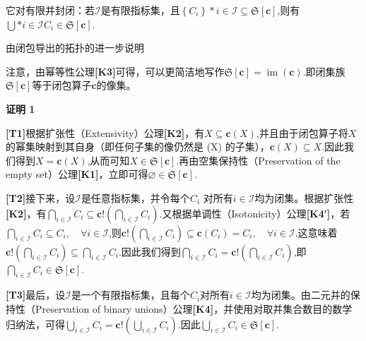 它对有限并封闭：若$\mathcal{I}$是有限指标集，且$\left\{ C_i \right\}*{i \in \mathcal{I}} \subseteq {\mathfrak{S}}[\mathbf{c}]$,则有$\bigcup*{i \in \mathcal{I}} C_i \in {\mathfrak{S}}[\mathbf{c}]$.

由闭包导出的拓扑的进一步说明

注意，由幂等性公理\textbf{[K3]}可得，可以更简洁地写作${\mathfrak{S}}[\mathbf{c}] = \operatorname{im}(\mathbf{c})$.即闭集族${\mathfrak{S}}[\mathbf{c}]$等于闭包算子$\mathbf{c}$的像集。

\textbf{证明 1}

\textbf{[T1]}根据扩张性（Extensivity）公理\textbf{[K2]}，有$X \subseteq \mathbf{c}(X)$,并且由于闭包算子将$X$的幂集映射到其自身（即任何子集的像仍然是 (X) 的子集），$\mathbf{c}(X) \subseteq X$.因此我们得到$X = \mathbf{c}(X)$,从而可知$X \in {\mathfrak{S}}[\mathbf{c}]$.再由空集保持性（Preservation of the empty set）公理\textbf{[K1]}，立即可得$\varnothing \in {\mathfrak{S}}[\mathbf{c}]$.

\textbf{[T2]}接下来，设$\mathcal{I}$是任意指标集，并令每个$C_i$ 对所有$i \in \mathcal{I}$均为闭集。根据扩张性\textbf{[K2]}，有$\bigcap_{i \in \mathcal{I}} C_i \subseteq \mathbf{c}!\left( \bigcap_{i \in \mathcal{I}} C_i \right)$.又根据单调性（Isotonicity）公理\textbf{[K4′]}，若$\bigcap_{i \in \mathcal{I}} C_i \subseteq C_i, \quad \forall i \in \mathcal{I}$,则$\mathbf{c}!\left( \bigcap_{i \in \mathcal{I}} C_i \right) \subseteq \mathbf{c}(C_i) = C_i, \quad \forall i \in \mathcal{I}$.这意味着$\mathbf{c}!\left( \bigcap_{i \in \mathcal{I}} C_i \right) \subseteq \bigcap_{i \in \mathcal{I}} C_i$.因此我们得到$\bigcap_{i \in \mathcal{I}} C_i = \mathbf{c}!\left( \bigcap_{i \in \mathcal{I}} C_i \right)$,即$\bigcap_{i \in \mathcal{I}} C_i \in {\mathfrak{S}}[\mathbf{c}]$.

\textbf{[T3]}最后，设$\mathcal{I}$是一个有限指标集，且每个$C_i$对所有$i \in \mathcal{I}$均为闭集。由二元并的保持性（Preservation of binary unions）公理\textbf{[K4]}，并使用对取并集合数目的数学归纳法，可得$\bigcup_{i \in \mathcal{I}} C_i = \mathbf{c}!\left( \bigcup_{i \in \mathcal{I}} C_i \right)$.因此$\bigcup_{i \in \mathcal{I}} C_i \in {\mathfrak{S}}[\mathbf{c}]$.
